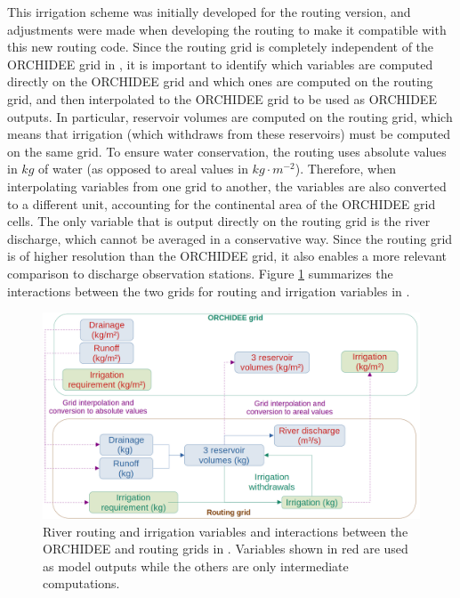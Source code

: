 This irrigation scheme was initially developed for the \std routing version, and adjustments were made when developing the \native routing to make it compatible with this new routing code. Since the routing grid is completely independent of the ORCHIDEE grid in \native, it is important to identify which variables are computed directly on the ORCHIDEE grid and which ones are computed on the routing grid, and then interpolated to the ORCHIDEE grid to be used as ORCHIDEE outputs.
In particular, reservoir volumes are computed on the routing grid, which means that irrigation (which withdraws from these reservoirs) must be computed on the same grid.
To ensure water conservation, the \native routing uses absolute values in $kg$ of water (as opposed to areal values in $kg \cdot m^{-2}$). Therefore, when interpolating variables from one grid to another, the variables are also converted to a different unit, accounting for the continental area of the ORCHIDEE grid cells.
The only variable that is output directly on the routing grid is the river discharge, which cannot be averaged in a conservative way. Since the routing grid is of higher resolution than the ORCHIDEE grid, it also enables a more relevant comparison to discharge observation stations.
Figure \ref{fig:irrig_interpolations_outputvars} summarizes the interactions between the two grids for routing and irrigation variables in \native.

\begin{figure}[htbp]
    \centering
    \includegraphics[width=\textwidth]{images/methods/routing_irrig_interpolation_outputvars.png}
    \caption{River routing and irrigation variables and interactions between the ORCHIDEE and routing grids in \native. Variables shown in red are used as model outputs while the others are only intermediate computations.}
    \label{fig:irrig_interpolations_outputvars}
\end{figure}
